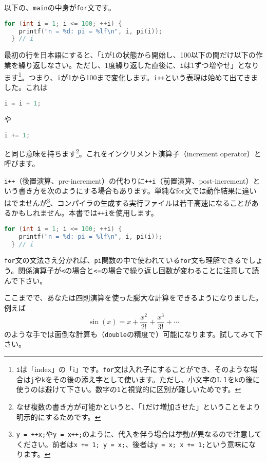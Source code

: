 以下の、\texttt{main}の中身が\texttt{for}文です。
\begin{lstlisting}[language=c++]
  for (int i = 1; i <= 100; ++i) {
    printf("n = %d: pi = %lf\n", i, pi(i));
  } // i
\end{lstlisting}
最初の行を日本語にすると、「\texttt{i}が1の状態から開始し、100以下の間だけ以下の作業を繰り返しなさい。ただし、1度繰り返した直後に、\texttt{i}は1ずつ増やせ」となります\footnote{\texttt{i}は「index」の「i」です。\texttt{for}文は入れ子にすることができ、そのような場合は\texttt{j}や\texttt{k}をその後の添え字として使います。ただし、小文字のL \texttt{l}を\texttt{k}の後に使うのは避けて下さい。数字の\texttt{1}と視覚的に区別が難しいためです。}。つまり、\texttt{i}が1から100まで変化します。\texttt{i++}という表現は始めて出てきました。これは
\begin{lstlisting}[language=c++]
i = i + 1;
\end{lstlisting}
や
\begin{lstlisting}[language=c++]
i += 1;
\end{lstlisting}
と同じ意味を持ちます\footnote{なぜ複数の書き方が可能かというと、「1だけ増加させた」ということをより明示的にするためです。}。これをインクリメント演算子（increment operator）と呼びます。

\texttt{i++}（後置演算、pre-increment）の代わりに\texttt{++i}（前置演算、post-increment）という書き方を次のようにする場合もあります。単純なfor文では動作結果に違いはでませんが\footnote{\texttt{y = ++x;}や\texttt{y = x++;}のように、代入を伴う場合は挙動が異なるので注意してください。前者は\texttt{x += 1; y = x;}、後者は\texttt{y = x; x += 1;}という意味になります。}、コンパイラの生成する実行ファイルは若干高速になることがあるかもしれません。本書では\texttt{++i}を使用します。
\begin{lstlisting}[language=c++]
  for (int i = 1; i <= 100; ++i) {
    printf("n = %d: pi = %lf\n", i, pi(i));
  } // i
\end{lstlisting}

\texttt{for}文の文法さえ分かれば、\texttt{pi}関数の中で使われている\texttt{for}文も理解できるでしょう。関係演算子が\texttt{<}の場合と\texttt{<=}の場合で繰り返し回数が変わることに注意して読んで下さい。

ここまでで、あなたは四則演算を使った膨大な計算をできるようになりました。例えば
\begin{equation}
\sin(x) = x + \frac{x^2}{2!} + \frac{x^3}{3!} + \cdots
\end{equation}
のような手では面倒な計算も（\texttt{double}の精度で）可能になります。試してみて下さい。

